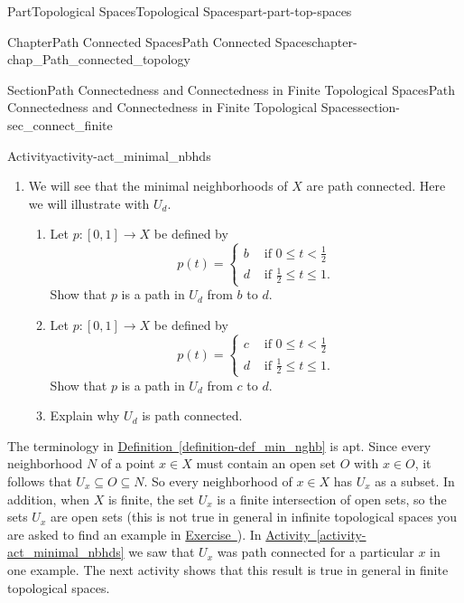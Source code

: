 \documentclass[oneside,10pt,]{book}
\newcommand{\xreffont}{\relax}
\newcommand{\terminology}[1]{\textbf{#1}}
\numberwithin{equation}{chapter}
\newcommand{\lt}{<}
\newcommand{\amp}{&}
\begin{document}
\begin{partptx}{Part}{Topological Spaces}{}{Topological Spaces}{}{}{part-part-top-spaces}
\begin{chapterptx}{Chapter}{Path Connected Spaces}{}{Path Connected Spaces}{}{}{chapter-chap_Path_connected_topology}
\begin{sectionptx}{Section}{Path Connectedness and Connectedness in Finite Topological Spaces}{}{Path Connectedness and Connectedness in Finite Topological Spaces}{}{}{section-sec_connect_finite}
\begin{activity}{Activity}{}{activity-act_minimal_nbhds}
\begin{enumerate}[font=\bfseries,label=(\alph*),ref=\alph*]
\begin{definition}{Definition}{}{definition-def_min_nghb}%
%
For \(x \in X\), the \terminology{minimal neighborhood} \(U_x\) of \(x\) is the intersection of all open sets that contain \(x\).%
\end{definition}
Find \(U_x\) for each \(x \in X\).%
\item{}We will see that the minimal neighborhoods of \(X\) are path connected. Here we will illustrate with \(U_d\).%
\begin{enumerate}[font=\bfseries,label=(\roman*),ref=\theenumi.\roman*]%
\item{}Let \(p : [0,1] \to X\) be defined by%
\begin{equation*}
p(t) = \begin{cases}b \amp \text{ if }  0 \leq t \lt  \frac{1}{2} \\ d \amp \text{ if }  \frac{1}{2} \leq t \leq 1. \end{cases}
\end{equation*}
Show that \(p\) is a path in \(U_d\) from \(b\) to \(d\).%
\item{}Let \(p : [0,1] \to X\) be defined by%
\begin{equation*}
p(t) = \begin{cases}c \amp \text{ if }  0 \leq t \lt  \frac{1}{2} \\ d \amp \text{ if }  \frac{1}{2} \leq t \leq 1. \end{cases}
\end{equation*}
Show that \(p\) is a path in \(U_d\) from \(c\) to \(d\).%
\item{}Explain why \(U_d\) is path connected.%
\end{enumerate}%
\end{enumerate}%
\end{activity}%
The terminology in \hyperref[definition-def_min_nghb]{Definition~{\xreffont\ref{definition-def_min_nghb}}} is apt. Since every neighborhood \(N\) of a point \(x \in X\) must contain an open set \(O\) with \(x \in O\), it follows that \(U_x \subseteq O \subseteq N\). So every neighborhood of \(x \in X\) has \(U_x\) as a subset. In addition, when \(X\) is finite, the set \(U_x\) is a finite intersection of open sets, so the sets \(U_x\) are open sets (this is not true in general in infinite topological spaces \textemdash{} you are asked to find an example in \hyperlink{exercise-ex_U_x_not_open}{Exercise~{\xreffont 1}}). In \hyperref[activity-act_minimal_nbhds]{Activity~{\xreffont\ref{activity-act_minimal_nbhds}}} we saw that \(U_x\) was path connected for a particular \(x\) in one example. The next activity shows that this result is true in general in finite topological spaces.%

\end{sectionptx}
\end{chapterptx}
\end{partptx}
\end{document}
